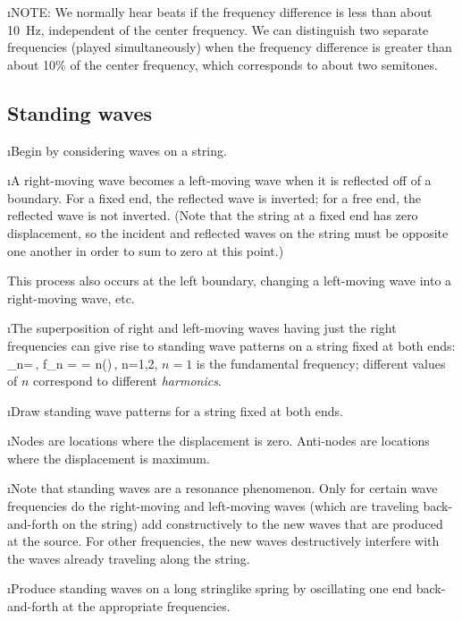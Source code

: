 \i NOTE: 
We normally hear beats if the frequency difference is less 
than about 10~Hz, independent of the center frequency.
We can distinguish two separate frequencies (played simultaneously)
when the frequency
difference is greater than about 10\% of the center frequency,
which corresponds to about two semitones.

\ei

\subsection{Standing waves}

\bi

\i Begin by considering waves on a string.

\i A right-moving wave becomes a left-moving wave
when it is reflected off of a boundary.
For a fixed end, the reflected wave is inverted;
for a free end, the reflected wave is not inverted.
(Note that the string at a fixed end has zero displacement,
so the incident and reflected waves on the string 
must be opposite one another in order to sum to 
zero at this point.)

This process also occurs at the left boundary, changing
a left-moving wave into a right-moving wave, etc.

\i The superposition of right and left-moving waves having
just the right frequencies 
can give rise to standing 
wave patterns on a string fixed at both ends:
%
\be
\lambda_n=\,,
\quad
f_n =  = n\left(\right)\,,
\quad
n=1,2,\cdots
\ee
%
$n=1$ is the fundamental frequency; different values of 
$n$ correspond to different {\em harmonics}.

\i Draw standing wave patterns for a string fixed at both ends.

\i Nodes are locations where the displacement is zero.
Anti-nodes are locations where the displacement is maximum.

\i Note that standing waves are a resonance phenomenon.
Only for certain wave frequencies do the right-moving and left-moving
waves (which are traveling back-and-forth on the string) add 
constructively to the new waves that are produced at the source.
For other frequencies, the new waves destructively interfere with
the waves already traveling along the string.

\i \demo Produce standing waves on a long stringlike spring
by oscillating one end back-and-forth at the appropriate 
frequencies.

